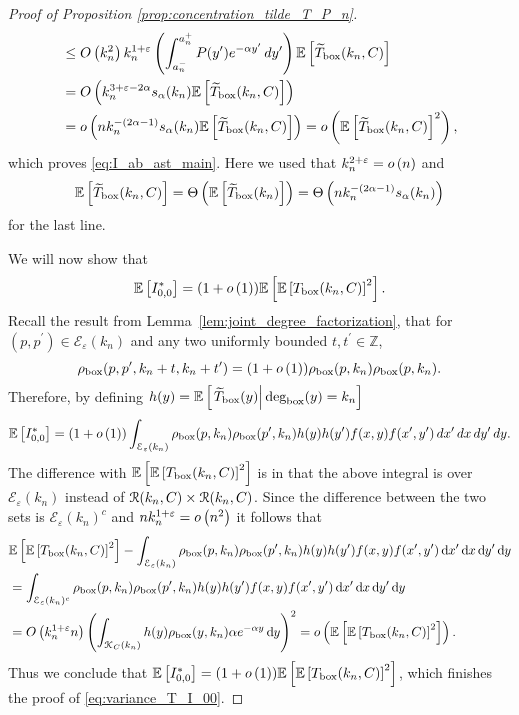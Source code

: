 \begin{proof}[Proof of Proposition \ref{prop:concentration_tilde_T_P_n}]
\begin{align*}
	&\le O\left(k_n^2\right) k_n^{1+\varepsilon} \left(\int_{a_n^-}^{a_n^+} P(y^\prime) 
		e^{-\alpha y^\prime} \, dy^\prime\right) \mathbb{E}\left[\widetilde{T}_{\text{box}}(k_n,C)\right]\\
	&= O\left(k_n^{3 + \varepsilon -2\alpha} s_\alpha(k_n) \mathbb{E}\left[\widetilde{T}_{\text{box}}(k_n,C)\right]\right)\\
	&= o\left(n k_n^{-(2\alpha - 1)}s_\alpha(k_n) \mathbb{E}\left[\widetilde{T}_{\text{box}}(k_n,C)\right]\right) 
		= o\left(\mathbb{E}\left[\widetilde{T}_{\text{box}}(k_n,C)\right]^2\right),
\end{align*}
which proves \eqref{eq:I_ab_ast_main}. Here we used that $k_n^{2 + \varepsilon} = o\left(n\right)$ and
\[
	\mathbb{E}\left[\widetilde{T}_{\text{box}}(k_n,C)\right] = \Theta\left(\mathbb{E}\left[\widetilde{T}_{\text{box}}(k_n)\right]\right) 
	= \Theta\left(n k_n^{-(2\alpha - 1)}s_\alpha(k_n)\right)
\] 
for the last line.

We will now show that
\[
	\mathbb{E}\left[I^\ast_{0,0}\right] = (1+o\left(1\right))\mathbb{E}\left[\mathbb{E}\left[T_{\text{box}}(k_n,C)\right]^2\right].
\]
Recall the result from Lemma~\ref{lem:joint_degree_factorization}, that for $(p,p^\prime) \in \mathcal{E}_{\varepsilon}(k_n)$ and any two uniformly bounded $t, t^\prime \in \mathbb{Z}$,
\[
	\rho_{\text{box}}(p,p^\prime,k_n + t,k_n+t^\prime) = (1 + o\left(1\right))\rho_{\text{box}}(p,k_n)\rho_{\text{box}}(p,k_n).
\]
Therefore, by defining $h(y) = \mathbb{E}\left[\left.\widetilde{T}_{\text{box}}(y)\right|\text{deg}_{\text{box}}(y) = k_n\right]$
\[
	\mathbb{E}\left[I_{0,0}^\ast\right] = (1 + o\left(1\right))\int_{\mathcal{E}_{\varepsilon}(k_n)}\rho_{\text{box}}(p,k_n)
		\rho_{\text{box}}(p^\prime,k_n)
		h(y) h(y^\prime) f(x,y)	f(x^\prime,y^\prime) \, dx^\prime \, dx \, dy^\prime \, dy.
\]
The difference with $\mathbb{E}\left[\mathbb{E}\left[T_{\text{box}}(k_n,C)\right]^2\right]$ is in that the above integral is over $\mathcal{E}_\varepsilon(k_n)$ instead of ${\mathcal R}(k_n,C) \times {\mathcal R}(k_n,C)$. Since the difference between the two sets is 
$\mathcal{E}_\varepsilon(k_n)^c$ and $n k_n^{1+\varepsilon} = o\left(n^2\right)$ it follows that
\begin{align*}
	&\mathbb{E}\left[\mathbb{E}\left[T_{\text{box}}(k_n,C)\right]^2\right]
		- \int_{\mathcal{E}_{\varepsilon}(k_n)}\rho_{\text{box}}(p,k_n)\rho_{\text{box}}(p^\prime,k_n)
		h(y) h(y^\prime) f(x,y)	f(x^\prime,y^\prime) \operatorname{\mathrm{d}\hspace{-2pt}} x^\prime \operatorname{\mathrm{d}\hspace{-2pt}} x \operatorname{\mathrm{d}\hspace{-2pt}} y^\prime \operatorname{\mathrm{d}\hspace{-2pt}} y\\
	&= \int_{\mathcal{E}_{\varepsilon}(k_n)^c}\rho_{\text{box}}(p,k_n)\rho_{\text{box}}(p^\prime,k_n)
		h(y) h(y^\prime) f(x,y)	f(x^\prime,y^\prime) \operatorname{\mathrm{d}\hspace{-2pt}} x^\prime \operatorname{\mathrm{d}\hspace{-2pt}} x \operatorname{\mathrm{d}\hspace{-2pt}} y^\prime \operatorname{\mathrm{d}\hspace{-2pt}} y\\
	&= O\left(k_n^{1+\varepsilon}n\right) 
		\left(\int_{{\mathcal K}_{C}(k_n)}h(y)\rho_{\text{box}}(y,k_n)\alpha e^{-\alpha y} \operatorname{\mathrm{d}\hspace{-2pt}} y\right)^2
		= o\left(\mathbb{E}\left[\mathbb{E}\left[T_{\text{box}}(k_n,C)\right]^2\right]\right).
\end{align*}
Thus we conclude that $\mathbb{E}\left[I^\ast_{0,0}\right] = (1+o\left(1\right))\mathbb{E}\left[\mathbb{E}\left[T_{\text{box}}(k_n,C)\right]^2\right]$, which finishes the proof of \eqref{eq:variance_T_I_00}.


\end{proof}

